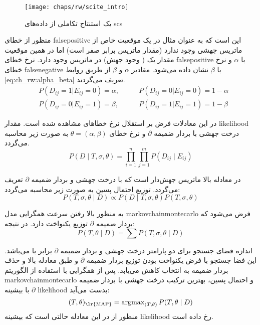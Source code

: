\begin{figure}[!ht]
	\centerline{\texttt{[image: chaps/rw/scite\_intro]}}
	\caption{یک استنتاج تکاملی از داده‌های \gls{scs} \cite{jahn2016tree}}
	\label{fig:ch_rw:scite_intro}
\end{figure}

منظور از خطای \gls{falsepositive} این است که به عنوان مثال در یک موقعیت خاص از ماتریس  جهشی وجود ندارد (مقدار ماتریس برابر صفر است) اما در همین موقعیت مقدار یک ( وجود جهش) در ماتریس  وجود دارد. نرخ خطای \gls{falsepositive} با  $\alpha$ و نرخ خطای \gls{falsenegative} با $\beta$ نشان داده می‌شود. مقادیر $\alpha$ و $\beta$ از طریق روابط \ref{eq:ch_rw:alpha_beta} تعریف می‌گردند.
\begin{equation}
	\begin{aligned}
		&P(D_{ij}=1|E_{ij}=0)=\alpha, &\qquad P(D_{ij}=0|E_{ij}=0)=1-\alpha \\ &P(D_{ij}=0|E_{ij}=1)=\beta, &\qquad P(D_{ij}=1|E_{ij}=1)=1-\beta
	\end{aligned}
	\label{eq:ch_rw:alpha_beta}
\end{equation}

 در این معادلات فرض بر استقلال نرخ خطاهای مشاهده شده است. مقدار \gls{likelihood} درخت جهشی  با بردار ضمیمه $\partial$ و نرخ خطای $\theta = (\alpha, \beta)$ به صورت زیر محاسبه می‌گردد. 
 \begin{equation}
 	P(D \mid T, \sigma, \theta)=\prod_{i=1}^{n} \prod_{j=1}^{m} P\left(D_{i j} \mid E_{i j}\right)
 \end{equation}
 
 در معادله بالا  ماتریس جهش‌دار است که با درخت جهشی  و بردار ضمیمه $\partial$  تعریف می‌گردد. توزیع احتمال پسین به صورت زیر محاسبه می‌گردد: 
 \begin{equation}
	P(T, \sigma, \theta \mid D) \propto P(D \mid T, \sigma, \theta) P(T, \sigma, \theta)
\end{equation}

به منظور بالا رفتن سرعت همگرایی مدل \gls{markovchainmontecarlo} فرض می‌شود که بردار ضمیمه $\partial$ توزیع یکنواخت دارد. در نتیجه: 
 \begin{equation}
	P(T, \theta \mid D)=\sum P(T, \sigma, \theta \mid D)
\end{equation}

اندازه فضای جستجو برای دو پارامتر درخت جهشی  و بردار ضمیمه $\partial$ برابر با  می‌باشد. این فضا جستجو با فرض یکنواخت بودن توزیع بردار ضمیمه $\partial$ و طبق معادله بالا و حذف بردار ضمیمه به  انتخاب کاهش می‌یابد. پس از همگرایی با استفاده از الگوریتم \gls{markovchainmontecarlo} و احتمال پسین، بهترین ترکیب درخت جهشی  با بردار ضمیمه $\partial$ با بیشینه \gls{likelihood} بدست می‌آید: 
 \begin{equation}
	(T, \theta)_\text{\lr{MAP}}=\operatorname{argmax}_{(T, \theta)} P(T, \theta \mid D)
\end{equation}
منظور از  در این معادله حالتی است که بیشینه \gls{likelihood} رخ داده است.  

